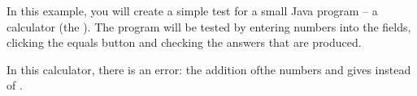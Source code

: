 In this example, you will create a simple test for a small Java program -- a calculator (the ). 
The program will be tested by entering numbers into the fields, clicking the equals button 
and checking the answers that are produced. 

In this calculator, there is an error: the addition ofthe numbers  and  gives  instead of .

